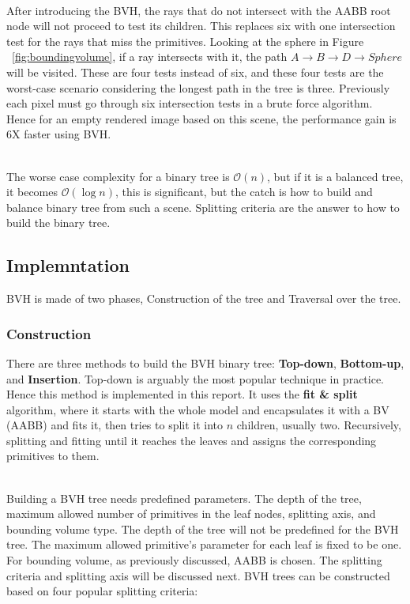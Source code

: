 \documentclass[11pt,a4paper]{article}
\begin{document}
\noindent
\\
After introducing the BVH,  the rays that do not intersect with the AABB root node will not proceed to test its children. This replaces six with one intersection test for the rays that miss the primitives. Looking at the sphere in Figure ~\ref{fig:boundingvolume}, if a ray intersects with it, the path $A \rightarrow B \rightarrow D \rightarrow Sphere$ will be visited. These are four tests instead of six, and these four tests are the worst-case scenario considering the longest path in the tree is three. Previously each pixel must go through six intersection tests in a brute force algorithm. Hence for an empty rendered image based on this scene, the performance gain is 6X faster using BVH. 

\noindent
\\
The worse case complexity for a binary tree is $\mathcal{O}(n)$, but if it is a balanced tree, it becomes $\mathcal{O}(\log{}n)$, this is significant, but the catch is how to build and balance binary tree from such a scene. Splitting criteria are the answer to how to build the binary tree. 



\subsection{Implemntation}
BVH is made of two phases, Construction of the tree and Traversal over the tree.  

\subsubsection{Construction}
There are three methods to build the BVH binary tree: \textbf{Top-down}, \textbf{Bottom-up}, and \textbf{Insertion}. Top-down is arguably the most popular technique in practice. Hence this method is implemented in this report. It uses the \textbf{fit \& split} algorithm, where it starts with the whole model and encapsulates it with a BV (AABB) and fits it, then tries to split it into $n$ children, usually two. Recursively, splitting and fitting until it reaches the leaves and assigns the corresponding primitives to them.


\noindent
\\
Building a BVH tree needs predefined parameters. The depth of the tree, maximum allowed number of primitives in the leaf nodes, splitting axis, and bounding volume type. The depth of the tree will not be predefined for the BVH tree. The maximum allowed primitive's parameter for each leaf is fixed to be one. For bounding volume, as previously discussed,  AABB is chosen. The splitting criteria and splitting axis will be discussed next. BVH trees can be constructed based on four popular splitting criteria:
\end{document}
